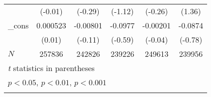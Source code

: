 {\begin{longtable}{l*{5}{c}}
            &     (-0.01)         &     (-0.29)         &     (-1.12)         &     (-0.26)         &      (1.36)         \\
\_cons      &    0.000523         &    -0.00801         &     -0.0977         &    -0.00201         &     -0.0874         \\
            &      (0.01)         &     (-0.11)         &     (-0.59)         &     (-0.04)         &     (-0.78)         \\
\hline
\(N\)       &      257836         &      242826         &      239226         &      249613         &      239956         \\
\hline\hline
\multicolumn{6}{l}{\footnotesize \textit{t} statistics in parentheses}\\
\multicolumn{6}{l}{\footnotesize \sym{*} \(p<0.05\), \sym{**} \(p<0.01\), \sym{***} \(p<0.001\)}\\
\label{tab:oaxaca_male}
\end{longtable}
}
